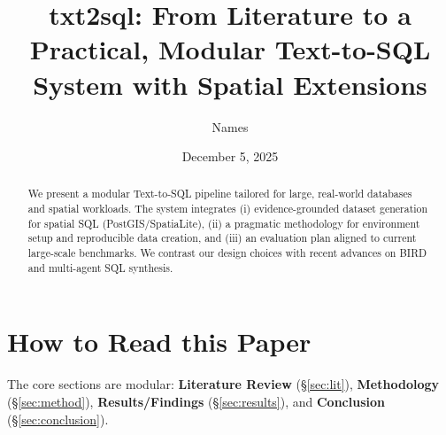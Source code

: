 \documentclass[11pt,a4paper]{article}
\title{txt2sql: From Literature to a Practical, Modular Text-to-SQL System with Spatial Extensions}
\author{Names}
\date{December 5, 2025}
\begin{document}
\maketitle

\begin{abstract}
We present a modular Text-to-SQL pipeline tailored for large, real-world databases and spatial workloads.
The system integrates (i) evidence-grounded dataset generation for spatial SQL (PostGIS/SpatiaLite), (ii) a pragmatic methodology for environment setup and reproducible data creation, and (iii) an evaluation plan aligned to current large-scale benchmarks. We contrast our design choices with recent advances on BIRD and multi-agent SQL synthesis.
\end{abstract}

\section*{How to Read this Paper}
The core sections are modular: \textbf{Literature Review} (\S\ref{sec:lit}), \textbf{Methodology} (\S\ref{sec:method}), \textbf{Results/Findings} (\S\ref{sec:results}), and \textbf{Conclusion} (\S\ref{sec:conclusion}).








\end{document}

